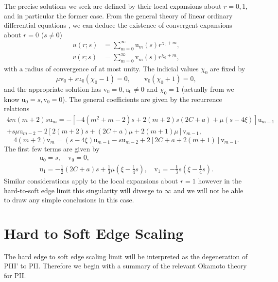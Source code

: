 \documentclass[10pt,reqno]{amsart}
\theoremstyle{plain}
\theoremstyle{definition}
\theoremstyle{remark}
\begin{document}
The precise solutions we seek are defined by their local expansions about $ r=0,1 $, and in particular 
the former case. From the general theory of linear ordinary differential equations \cite{Sibuya_1990}, 
\cite{CL_1955} we can deduce the existence of convergent expansions about $ r=0 $ ($ s\neq 0 $)
\begin{align}
 u(r;s) & = \sum_{m=0}^{\infty}\text{u}_{m}(s)r^{\chi_0+m} ,
\label{uExpr=0}\\
 v(r;s) & = \sum_{m=0}^{\infty}\text{v}_{m}(s)r^{\chi_0+m} ,
\label{vExpr=0}
\end{align}
with a radius of convergence of at most unity. The indicial values $ \chi_0 $ are fixed by
\begin{equation}
 \mu\text{v}_0+s\text{u}_0(\chi_0-1) = 0,\qquad \text{v}_0(\chi_0+1) = 0 ,
\end{equation}
and the appropriate solution has $ \text{v}_0=0, \text{u}_0 \neq 0 $ and $ \chi_0=1 $
(actually from \cite[Eqs. (5.38, 5.39)]{FW_2007} we know $ \text{u}_0=s, \text{v}_0=0 $).
The general coefficients are given by the recurrence relations
\begin{multline}
  4m(m+2)s\text{u}_{m} = -[-4(m^2+m-2)s+2(m+2)s(2C+a)+\mu(s-4\xi)]\text{u}_{m-1}
\\ 
     +s\mu\text{u}_{m-2}-2[ 2(m+2)s+(2C+a)\mu+2(m+1)\mu ]\text{v}_{m-1} ,
\label{uCff}
\end{multline}
\begin{equation}
  4(m+2)\text{v}_{m} = (s-4\xi)\text{u}_{m-1}-s\text{u}_{m-2}+2[ 2C+a+2(m+1) ]\text{v}_{m-1} .
\label{vCff}
\end{equation}
The first few terms are given by
\begin{gather}
 \text{u}_{0} = s, \quad \text{v}_{0} = 0, 
\label{uvCff:0}\\
 \text{u}_{1} = -\tfrac{1}{2}(2C+a)s+\tfrac{1}{3}\mu(\xi-\tfrac{1}{4}s), \quad \text{v}_{1} = -\tfrac{1}{3}s(\xi-\tfrac{1}{4}s) .
\label{uvCff:1}
\end{gather}
Similar considerations apply to the local expansions about $ r=1 $ however in the hard-to-soft
edge limit this singularity will diverge to $ \infty $ and we will not be able to draw any simple
conclusions in this case.

\section{Hard to Soft Edge Scaling}\label{S:H2S}
\setcounter{equation}{0}

The hard edge to soft edge scaling limit \cite{BF_2003} will be interpreted as the degeneration of
PIII' to PII. Therefore we begin with a summary of the relevant Okamoto theory for PII.
\end{document}
